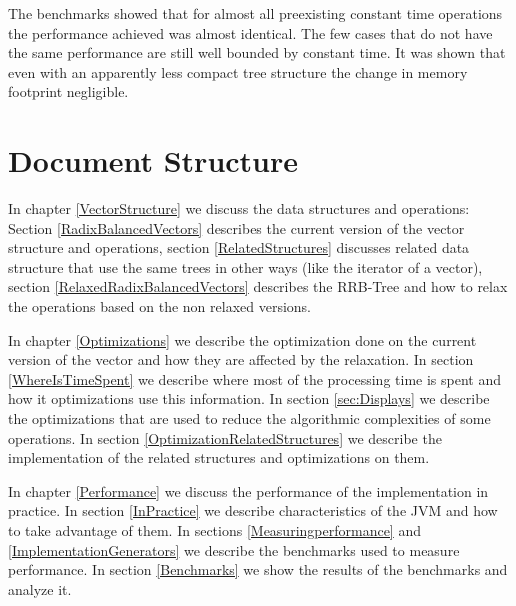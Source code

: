 The benchmarks showed that for almost all preexisting constant time operations the performance achieved was almost identical. The few cases that do not have the same performance are still well bounded by constant time. It was shown that even with an apparently less compact tree structure the change in memory footprint negligible.

\section{Document Structure}
In chapter \ref{VectorStructure} we discuss the data structures and operations: Section \ref{RadixBalancedVectors} describes the current version of the vector structure and operations, section \ref{RelatedStructures} discusses related data structure that use the same trees in other ways (like the iterator of a vector), section \ref{RelaxedRadixBalancedVectors} describes the RRB-Tree and how to relax the operations based on the non relaxed versions.

In chapter \ref{Optimizations} we describe the optimization done on the current version of the vector and how they are affected by the relaxation. In section \ref{WhereIsTimeSpent} we describe where most of the processing time is spent and how it optimizations use this information. In section \ref{sec:Displays} we describe the optimizations that are used to reduce the algorithmic complexities of some operations. In section \ref{OptimizationRelatedStructures} we describe the implementation of the related structures and optimizations on them.

In chapter \ref{Performance} we discuss the performance of the implementation in practice. In section \ref{InPractice} we describe characteristics of the JVM and how to take advantage of them. In sections \ref{Measuringperformance} and \ref{ImplementationGenerators} we describe the benchmarks used to measure performance. In section \ref{Benchmarks} we show  the results of the benchmarks and analyze it.


